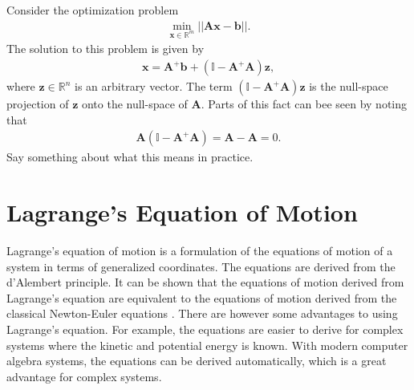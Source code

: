 Consider the optimization problem
\begin{align}
    \min_{\bm{x} \in \mathbb{R}^m} || \bm{A} \bm{x} - \bm{b} ||.
\end{align}
The solution to this problem is given by
\begin{align}
    \bm{x} = \bm{A}^{+} \bm{b} + (\mathbb{I} - \bm{A}^{+} \bm{A}) \bm{z},
\end{align}
where $\bm{z} \in \mathbb{R}^n$ is an arbitrary vector. The term $(\mathbb{I} - \bm{A}^{+} \bm{A}) \bm{z}$
is the null-space projection of $\bm{z}$ onto the null-space of $\bm{A}$. Parts
of this fact can bee seen by noting that
\begin{align}
    \bm{A}\left(\mathbb{I} - \bm{A}^{+} \bm{A}\right) = \bm{A} - \bm{A} = 0.
\end{align}
{\color{red}Say something about what this means in practice.}

\section{Lagrange's Equation of Motion}
Lagrange's equation of motion is a formulation of the equations of motion of a
system in terms of generalized coordinates. The equations are derived from the
d'Alembert principle. It can be shown that the equations of motion derived from
Lagrange's equation are equivalent to the equations of motion derived from
the classical Newton-Euler equations \cite{modsim}. There are however some advantages to using
Lagrange's equation. For example, the equations are easier to derive for complex
systems where the kinetic and potential energy is known. With modern computer
algebra systems, the equations can be derived automatically, which is
a great advantage for complex systems.

